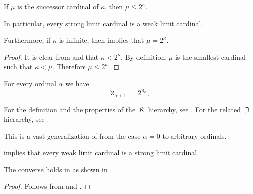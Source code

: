 \begin{proposition}\label{thm:strong_limit_cardinal_is_weak_limit}
  If \( \mu \) is the successor cardinal of \( \kappa \), then \( \mu \leq 2^\kappa \).

  In particular, every \hyperref[def:successor_and_limit_cardinal/strong_limit]{strong limit cardinal} is a \hyperref[def:successor_and_limit_cardinal/strong_limit]{weak limit cardinal}.

  Furthermore, if \( \kappa \) is infinite, then  implies that \( \mu = 2^\kappa \).
\end{proposition}
\begin{proof}
  It is clear from  and  that \( \kappa < 2^\kappa \). By definition, \( \mu \) is the smallest cardinal such that \( \kappa < \mu \). Therefore \( \mu \leq 2^\kappa \).
\end{proof}

\begin{conjecture}\label{hyp:generalized_continuum_hypothesis}
  For every ordinal \( \alpha \) we have
  \begin{equation*}
    \aleph_{\alpha + 1} = 2^{\aleph_\alpha},
  \end{equation*}

  For the definition and the properties of the \( \aleph \) hierarchy, see . For the related \( \beth \) hierarchy, see .

  This is a vast generalization of  from the case \( \alpha = 0 \) to arbitrary ordinals.
\end{conjecture}

\begin{corollary}\label{thm:limit_cardinals_and_gch}
   implies that every \hyperref[def:successor_and_limit_cardinal/weak_limit]{weak limit cardinal} is a \hyperref[def:successor_and_limit_cardinal/strong_limit]{strong limit cardinal}.

  The converse holds in  as shown in .
\end{corollary}
\begin{proof}
  Follows from  and .
\end{proof}

